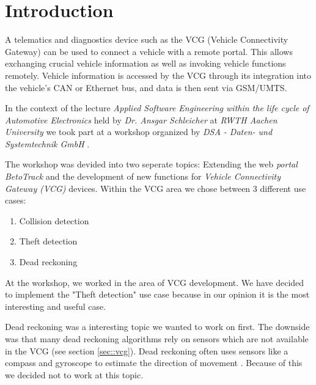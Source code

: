 \chapter{Introduction}

A telematics and diagnostics device such as the VCG (Vehicle Connectivity Gateway) can be used to connect a vehicle with a remote portal. This allows exchanging crucial vehicle information as well as invoking vehicle functions remotely. Vehicle information is accessed by the VCG through its integration into the vehicle's CAN or Ethernet bus, and data is then sent via GSM/UMTS. 

In the context of the lecture \textit{Applied Software Engineering within the life cycle of Automotive Electronics} held by \textit{Dr. Ansgar Schleicher} at \textit{RWTH Aachen University} we took part at a workshop organized by \textit{DSA - Daten- und Systemtechnik GmbH} \cite{DSA}.

The workshop was devided into two seperate topics: Extending the web \textit{portal BetoTrack} and the development of new functions for \textit{Vehicle Connectivity Gateway (VCG)} devices. Within the VCG area we chose between 3 different use cases: 
\begin{enumerate}
    \item Collision detection
    \item Theft detection
    \item Dead reckoning
\end{enumerate} 
At the workshop, we worked in the area of VCG development. We have decided to implement the "Theft detection" use case because in our opinion it is the most interesting and useful case.

Dead reckoning was a interesting topic we wanted to work on first. The downside was that many dead reckoning algorithms rely on sensors which are not available in the VCG (see section \ref{sec::vcg}). Dead reckoning often uses sensors like a compass and gyroscope to estimate the direction of movement \cite{kao1991integration}. Because of this we decided not to work at this topic.

